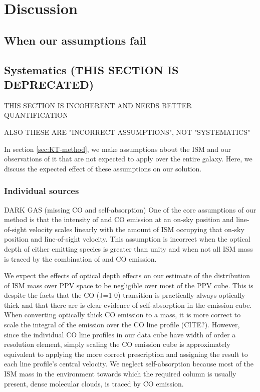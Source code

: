 \section{Discussion}
\label{sec:discussion}

\subsection{When our assumptions fail}
\label{sec:discussion-systematics}


\subsection{Systematics (THIS SECTION IS DEPRECATED)}
THIS SECTION IS INCOHERENT AND NEEDS BETTER QUANTIFICATION

ALSO THESE ARE "INCORRECT ASSUMPTIONS", NOT "SYSTEMATICS"

In section \ref{sec:KT-method}, we make assumptions about the ISM and our observations of it that are not expected to apply over the entire galaxy. Here, we discuss the expected effect of these assumptions on our solution.
\subsubsection{Individual sources}
DARK GAS (missing CO and \atomH self-absorption)
One of the core assumptions of our method is that the intensity of \atomH and CO emission at an on-sky position and line-of-sight velocity scales linearly with the amount of ISM occupying that on-sky position and line-of-sight velocity. This assumption is incorrect when the optical depth of either emitting species is greater than unity and when not all ISM mass is traced by the combination of \atomH and CO emission. 

We expect the effects of optical depth effects on our estimate of the distribution of ISM mass over PPV space to be negligible over most of the PPV cube. This is despite the facts that the CO (J=1-0) transition is practically always optically thick and that there are is clear evidence of \atomH self-absorption in the \atomH emission cube. When converting optically thick CO emission to a \molH mass, it is more correct to scale the integral of the emission over the CO line profile (CITE?). However, since the individual CO line profiles in our data cube have width of order a resolution element, simply scaling the CO emission cube is approximately equivalent to applying the more correct prescription and assigning the result to each line profile's central velocity. We neglect \atomH self-absorption because most of the ISM mass in the environment towards which the required \atomH column is usually present, dense molecular clouds, is traced by CO emission. 

